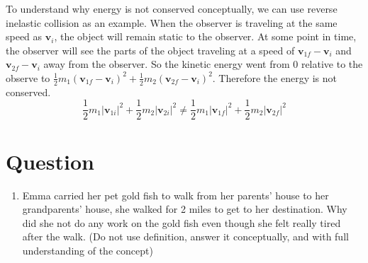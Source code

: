 \documentclass[]{article}
\begin{document}
To understand why energy is not conserved conceptually, we can use reverse inelastic collision as an example. When the observer is traveling at the same speed as $\mathbf{v}_{i}$, the object will remain static to the observer. At some point in time, the observer will see the parts of the object traveling at a speed of $\mathbf{v}_{1f} -\mathbf{v}_{i}$ and  $\mathbf{v}_{2f} -\mathbf{v}_{i}$ away from the observer. So the kinetic energy went from $0$ relative to the observe to $\frac{1}{2} m_1(\mathbf{v}_{1f} -\mathbf{v}_{i})^2 + \frac{1}{2} m_2 (\mathbf{v}_{2f} -\mathbf{v}_{i})^2$. Therefore the energy is not conserved.
$$\frac{1}{2} m_1 |\mathbf{v}_{1i}|^2 + \frac{1}{2} m_2 |\mathbf{v}_{2i}|^2 \neq \frac{1}{2} m_1 |\mathbf{v}_{1f}|^2 + \frac{1}{2} m_2 |\mathbf{v}_{2f}|^2$$


\section{Question}
\begin{enumerate}
	\item Emma carried her pet gold fish to walk from her parents' house to her grandparents' house, she walked for 2 miles to get to her destination. Why did she not do any work on the gold fish even though she felt really tired after the walk. (Do not use definition, answer it conceptually, and with full understanding of the concept)
\end{enumerate}
\end{document}
